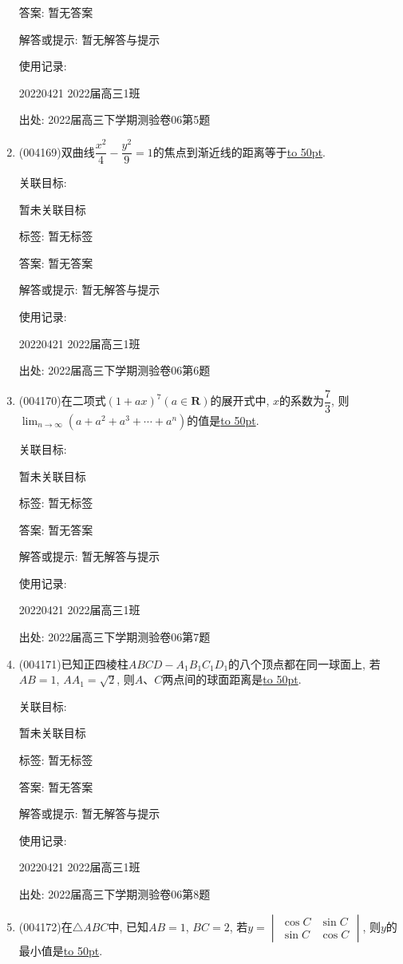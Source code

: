\documentclass[10pt,a4paper]{article}
\newcommand{\blank}[1]{\underline{\hbox to #1pt{}}}
\begin{document}
\begin{enumerate}[1.]
答案: 暂无答案

解答或提示: 暂无解答与提示

使用记录:

20220421	2022届高三1班	


出处: 2022届高三下学期测验卷06第5题
\item { (004169)}双曲线$\dfrac{x^2}4-\dfrac{y^2}9=1$的焦点到渐近线的距离等于\blank{50}.


关联目标:

暂未关联目标



标签: 暂无标签

答案: 暂无答案

解答或提示: 暂无解答与提示

使用记录:

20220421	2022届高三1班	


出处: 2022届高三下学期测验卷06第6题
\item { (004170)}在二项式$(1+ax)^7(a\in \mathbf{R})$的展开式中, $x$的系数为$\dfrac 73$, 则$\displaystyle\lim_{n\to \infty}(a+a^2+a^3+\cdots +a^n)$的值是\blank{50}.


关联目标:

暂未关联目标



标签: 暂无标签

答案: 暂无答案

解答或提示: 暂无解答与提示

使用记录:

20220421	2022届高三1班	


出处: 2022届高三下学期测验卷06第7题
\item { (004171)}已知正四棱柱$ABCD-A_1B_1C_1D_1$的八个顶点都在同一球面上, 若$AB=1$, $AA_1=\sqrt 2$, 则$A$、$C$两点间的球面距离是\blank{50}.


关联目标:

暂未关联目标



标签: 暂无标签

答案: 暂无答案

解答或提示: 暂无解答与提示

使用记录:

20220421	2022届高三1班	


出处: 2022届高三下学期测验卷06第8题
\item { (004172)}在$\triangle ABC$中, 已知$AB=1$, $BC=2$, 若$y=\begin{vmatrix}
\cos C & \sin C  \\ \sin C  & \cos C  \end{vmatrix}$, 则$y$的最小值是\blank{50}.



\end{enumerate}
\end{document}
